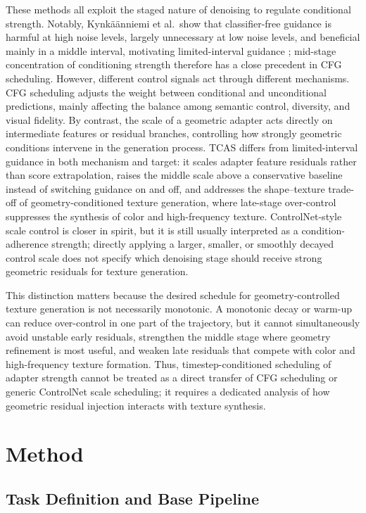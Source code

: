 \documentclass[times,twocolumn,final]{elsarticle}
\begin{document}
These methods all exploit the staged nature of denoising to regulate conditional strength. Notably, Kynk\"a\"anniemi et al.\ show that classifier-free guidance is harmful at high noise levels, largely unnecessary at low noise levels, and beneficial mainly in a middle interval, motivating limited-interval guidance \cite{kynkanniemi2024limited}; mid-stage concentration of conditioning strength therefore has a close precedent in CFG scheduling. However, different control signals act through different mechanisms. CFG scheduling adjusts the weight between conditional and unconditional predictions, mainly affecting the balance among semantic control, diversity, and visual fidelity. By contrast, the scale of a geometric adapter acts directly on intermediate features or residual branches, controlling how strongly geometric conditions intervene in the generation process. TCAS differs from limited-interval guidance in both mechanism and target: it scales adapter feature residuals rather than score extrapolation, raises the middle scale above a conservative baseline instead of switching guidance on and off, and addresses the shape--texture trade-off of geometry-conditioned texture generation, where late-stage over-control suppresses the synthesis of color and high-frequency texture. ControlNet-style scale control is closer in spirit, but it is still usually interpreted as a condition-adherence strength; directly applying a larger, smaller, or smoothly decayed control scale does not specify which denoising stage should receive strong geometric residuals for texture generation.

This distinction matters because the desired schedule for geometry-controlled texture generation is not necessarily monotonic. A monotonic decay or warm-up can reduce over-control in one part of the trajectory, but it cannot simultaneously avoid unstable early residuals, strengthen the middle stage where geometry refinement is most useful, and weaken late residuals that compete with color and high-frequency texture formation. Thus, timestep-conditioned scheduling of adapter strength cannot be treated as a direct transfer of CFG scheduling or generic ControlNet scale scheduling; it requires a dedicated analysis of how geometric residual injection interacts with texture synthesis.

\section{Method}
\label{sec:method}

\subsection{Task Definition and Base Pipeline}
\label{subsec:task}
\end{document}

